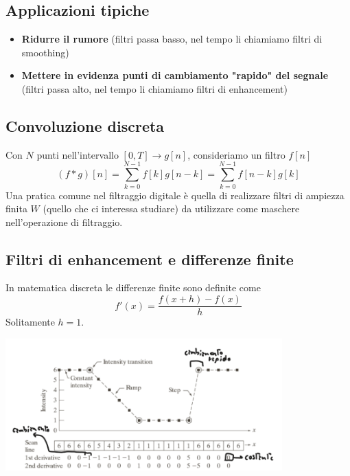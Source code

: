 \documentclass[12pt, a4paper]{report}
\begin{document}
\subsection{Applicazioni tipiche}
\begin{itemize}
    \item \textbf{Ridurre il rumore} (filtri passa basso, nel tempo li chiamiamo filtri di smoothing)
    \item \textbf{Mettere in evidenza punti di cambiamento "rapido" del segnale} (filtri passa alto, nel tempo li chiamiamo filtri di enhancement)
\end{itemize}
\subsection{Convoluzione discreta}
Con $N$ punti nell'intervallo $[0,T]\rightarrow g[n]$, consideriamo un filtro $f[n]$
\begin{equation*}
    (f*g)[n] = \sum_{k=0}^{N-1} f[k]g[n-k] = \sum_{k=0}^{N-1} f[n-k]g[k]
\end{equation*}
Una pratica comune nel filtraggio digitale è quella di realizzare filtri di ampiezza finita $W$ (quello che ci interessa studiare) da utilizzare come maschere nell'operazione di filtraggio.
\subsection{Filtri di enhancement e differenze finite}
In matematica discreta le differenze finite sono definite come
\begin{equation*}
    f'(x) = \frac{f(x+h)-f(x)}{h}
\end{equation*}
Solitamente $h=1$.
\begin{center}
    \includegraphics[width=0.8\textwidth]{Immagini/differenzefinite.png}
\end{center}
\end{document}
